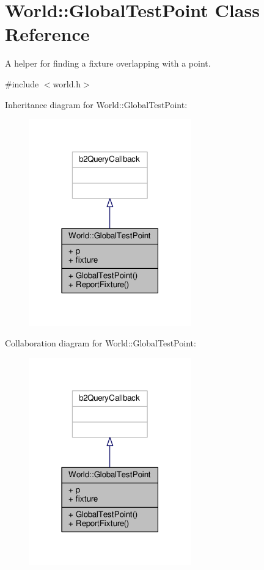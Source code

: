 \hypertarget{classWorld_1_1GlobalTestPoint}{}\section{World\+:\+:Global\+Test\+Point Class Reference}
\label{classWorld_1_1GlobalTestPoint}


A helper for finding a fixture overlapping with a point.  




{\ttfamily \#include $<$world.\+h$>$}



Inheritance diagram for World\+:\+:Global\+Test\+Point\+:
\nopagebreak
\begin{figure}[H]
\begin{center}
\leavevmode
\includegraphics[width=198pt]{classWorld_1_1GlobalTestPoint__inherit__graph}
\end{center}
\end{figure}


Collaboration diagram for World\+:\+:Global\+Test\+Point\+:
\nopagebreak
\begin{figure}[H]
\begin{center}
\leavevmode
\includegraphics[width=198pt]{classWorld_1_1GlobalTestPoint__coll__graph}
\end{center}
\end{figure}
